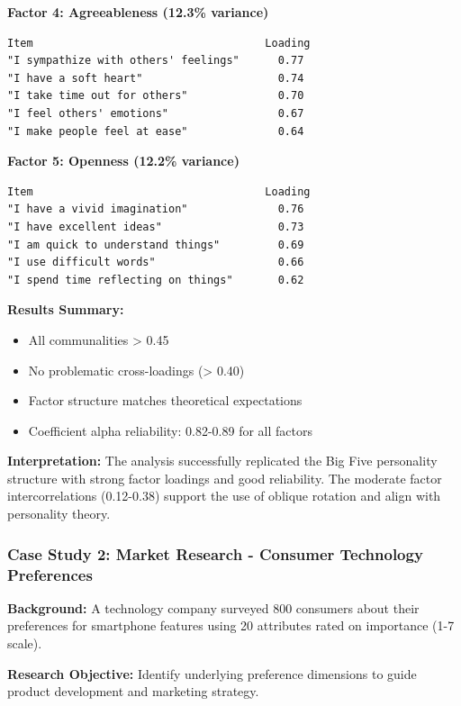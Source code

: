 \documentclass[
]{article}
\begin{document}
\textbf{Factor 4: Agreeableness (12.3\% variance)}

\begin{verbatim}
Item                                    Loading
"I sympathize with others' feelings"      0.77
"I have a soft heart"                     0.74
"I take time out for others"              0.70
"I feel others' emotions"                 0.67
"I make people feel at ease"              0.64
\end{verbatim}

\textbf{Factor 5: Openness (12.2\% variance)}

\begin{verbatim}
Item                                    Loading
"I have a vivid imagination"              0.76
"I have excellent ideas"                  0.73
"I am quick to understand things"         0.69
"I use difficult words"                   0.66
"I spend time reflecting on things"       0.62
\end{verbatim}

\textbf{Results Summary:}

\begin{itemize}
\item
  All communalities \textgreater{} 0.45
\item
  No problematic cross-loadings (\textgreater{} 0.40)
\item
  Factor structure matches theoretical expectations
\item
  Coefficient alpha reliability: 0.82-0.89 for all factors
\end{itemize}

\textbf{Interpretation:} The analysis successfully replicated the Big
Five personality structure with strong factor loadings and good
reliability. The moderate factor intercorrelations (0.12-0.38) support
the use of oblique rotation and align with personality theory.

\subsubsection{Case Study 2: Market Research - Consumer Technology
Preferences}

\textbf{Background:} A technology company surveyed 800 consumers about
their preferences for smartphone features using 20 attributes rated on
importance (1-7 scale).

\textbf{Research Objective:} Identify underlying preference dimensions
to guide product development and marketing strategy.
\end{document}
